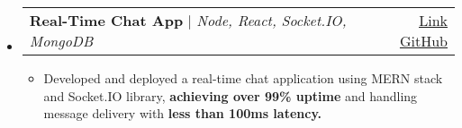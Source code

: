 \documentclass[a4paper,11pt]{article}
\makeatletter
\newcommand{\resumeItem}[1]{
  \item\small{
    {#1 \vspace{-2pt}}
  }
}
\newcommand{\resumeProjectHeading}[2]{
    \item
    \begin{tabular*}{0.97\textwidth}{l@{\extracolsep{\fill}}r}
      \small#1 & #2 \\
    \end{tabular*}\vspace{-7pt}
}
\newcommand{\resumeItemListStart}{\begin{itemize}}
\newcommand{\resumeItemListEnd}{\end{itemize}\vspace{-5pt}}
\makeatother
\begin{document}
\begin{itemize}[leftmargin=0.15in, label={}]
    \vspace{3pt}
    \resumeProjectHeading
        {\textbf{Real-Time Chat App} $|$ \emph{Node, React, Socket.IO, MongoDB}}{\hfill \href{https://chat-app-uwfk.onrender.com/}{\underline{Link}} \textbar{} \href{https://github.com/ubednama/chat-app}{\underline{GitHub}}}
        \resumeItemListStart
            \resumeItem{Developed and deployed a real-time chat application using MERN stack and Socket.IO library, \textbf{achieving over 99\% uptime} and handling message delivery with \textbf{less than 100ms latency.}}
        \resumeItemListEnd
        \end{itemize}

\vfill
{}
\end{document}
